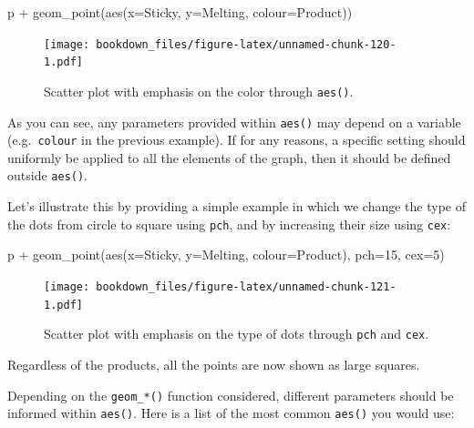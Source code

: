 \documentclass[
]{krantz}
\makeatletter
\newenvironment{Shaded}{\begin{snugshade}}{\end{snugshade}}
\newcommand{\AttributeTok}[1]{\textcolor[rgb]{0.61,0.61,0.61}{#1}}
\newcommand{\DecValTok}[1]{\textcolor[rgb]{0.06,0.06,0.06}{#1}}
\newcommand{\FunctionTok}[1]{\textcolor[rgb]{0,0,0}{#1}}
\newcommand{\NormalTok}[1]{#1}
\newcommand{\SpecialCharTok}[1]{\textcolor[rgb]{0,0,0}{#1}}
\newenvironment{kframe}{%
\medskip{}
\setlength{\fboxsep}{.8em}
 \def\at@end@of@kframe{}%
 \ifinner\ifhmode%
  \def\at@end@of@kframe{\end{minipage}}%
  \begin{minipage}{\columnwidth}%
 \fi\fi%
 \def\FrameCommand##1{\hskip\@totalleftmargin \hskip-\fboxsep
 \colorbox{shadecolor}{##1}\hskip-\fboxsep
     \hskip-\linewidth \hskip-\@totalleftmargin \hskip\columnwidth}%
 \MakeFramed {\advance\hsize-\width
   \@totalleftmargin\z@ \linewidth\hsize
   \@setminipage}}%
 {\par\unskip\endMakeFramed%
 \at@end@of@kframe}
\renewenvironment{Shaded}{\begin{kframe}}{\end{kframe}}
\makeatother
\begin{document}
\begin{Shaded}
\begin{Highlighting}[]
\NormalTok{p }\SpecialCharTok{+} \FunctionTok{geom\_point}\NormalTok{(}\FunctionTok{aes}\NormalTok{(}\AttributeTok{x=}\NormalTok{Sticky, }\AttributeTok{y=}\NormalTok{Melting, }\AttributeTok{colour=}\NormalTok{Product))}
\end{Highlighting}
\end{Shaded}

\begin{figure}
\centering
\texttt{[image: bookdown\_files/figure-latex/unnamed-chunk-120-1.pdf]}
\caption{\label{fig:unnamed-chunk-120}Scatter plot with emphasis on the color through \texttt{aes()}.}
\end{figure}

As you can see, any parameters provided within \texttt{aes()} may depend on a variable (e.g.~\texttt{colour} in the previous example).
If for any reasons, a specific setting should uniformly be applied to all the elements of the graph, then it should be defined outside \texttt{aes()}.

Let's illustrate this by providing a simple example in which we change the type of the dots from circle to square using \texttt{pch}, and by increasing their size using \texttt{cex}:

\begin{Shaded}
\begin{Highlighting}[]
\NormalTok{p }\SpecialCharTok{+} \FunctionTok{geom\_point}\NormalTok{(}\FunctionTok{aes}\NormalTok{(}\AttributeTok{x=}\NormalTok{Sticky, }\AttributeTok{y=}\NormalTok{Melting, }\AttributeTok{colour=}\NormalTok{Product), }\AttributeTok{pch=}\DecValTok{15}\NormalTok{, }\AttributeTok{cex=}\DecValTok{5}\NormalTok{)}
\end{Highlighting}
\end{Shaded}

\begin{figure}
\centering
\texttt{[image: bookdown\_files/figure-latex/unnamed-chunk-121-1.pdf]}
\caption{\label{fig:unnamed-chunk-121}Scatter plot with emphasis on the type of dots through \texttt{pch} and \texttt{cex}.}
\end{figure}

Regardless of the products, all the points are now shown as large squares.

Depending on the \texttt{geom\_*()} function considered, different parameters should be informed within \texttt{aes()}. Here is a list of the most common \texttt{aes()} you would use:
\end{document}
